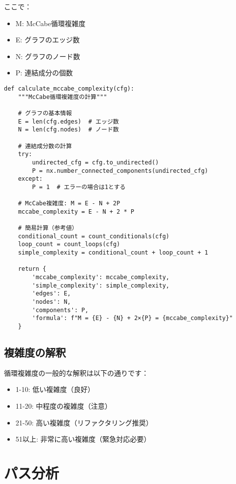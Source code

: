 \documentclass[12pt,a4paper]{article}
\begin{document}
ここで：
\begin{itemize}
    \item M: McCabe循環複雑度
    \item E: グラフのエッジ数
    \item N: グラフのノード数
    \item P: 連結成分の個数
\end{itemize}

\begin{lstlisting}[caption=正確なMcCabe複雑度の計算]
def calculate_mccabe_complexity(cfg):
    """McCabe循環複雑度の計算"""

    # グラフの基本情報
    E = len(cfg.edges)  # エッジ数
    N = len(cfg.nodes)  # ノード数

    # 連結成分数の計算
    try:
        undirected_cfg = cfg.to_undirected()
        P = nx.number_connected_components(undirected_cfg)
    except:
        P = 1  # エラーの場合は1とする

    # McCabe複雑度: M = E - N + 2P
    mccabe_complexity = E - N + 2 * P

    # 簡易計算（参考値）
    conditional_count = count_conditionals(cfg)
    loop_count = count_loops(cfg)
    simple_complexity = conditional_count + loop_count + 1

    return {
        'mccabe_complexity': mccabe_complexity,
        'simple_complexity': simple_complexity,
        'edges': E,
        'nodes': N,
        'components': P,
        'formula': f"M = {E} - {N} + 2×{P} = {mccabe_complexity}"
    }
\end{lstlisting}

\subsection{複雑度の解釈}

循環複雑度の一般的な解釈は以下の通りです：

\begin{itemize}
    \item 1-10: 低い複雑度（良好）
    \item 11-20: 中程度の複雑度（注意）
    \item 21-50: 高い複雑度（リファクタリング推奨）
    \item 51以上: 非常に高い複雑度（緊急対応必要）
\end{itemize}

\section{パス分析}
\end{document}
